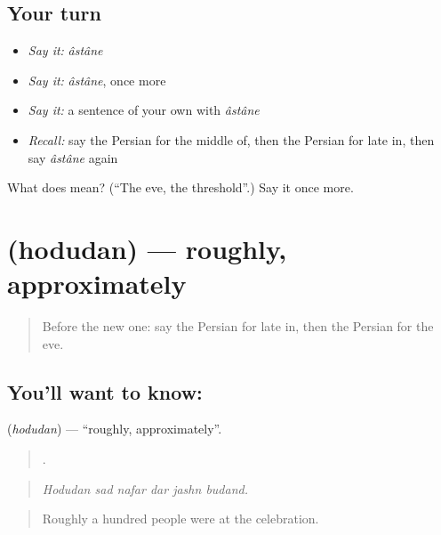 \subsection*{Your turn}
\begin{itemize}
\raggedright
  \item \emph{Say it:} \emph{âstâne}
  \item \emph{Say it:} \emph{âstâne}, once more
  \item \emph{Say it:} a sentence of your own with \emph{âstâne}
  \item \emph{Recall:} say the Persian for the middle of, then the Persian for late in, then say \emph{âstâne} again
\end{itemize}

\begin{tcolorbox}[breakable,colback=teal!4,colframe=teal!35!black,title={Before you move on}]
What does  mean? (\textquotedblleft{}The eve, the threshold\textquotedblright{}.) Say it once more.
\end{tcolorbox}
\section[\texorpdfstring{\fa{حدودا} (hodudan)}{حدودا (hodudan)}]{ (hodudan) — roughly, approximately}

\label{lesson:FA-C307-hodudan}



\begin{quote}
Before the new one: say the Persian for late in, then the Persian for the eve.
\end{quote}

\subsection*{You'll want to know: }
\textbf{} (\emph{hodudan}) — \textquotedblleft{}roughly, approximately\textquotedblright{}.

\begin{quote}
     .
\end{quote}

\begin{quote}
\emph{Hodudan sad nafar dar jashn budand.}
\end{quote}

\begin{quote}
Roughly a hundred people were at the celebration.
\end{quote}

